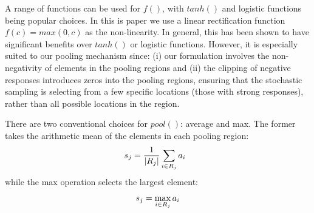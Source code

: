 \documentclass{article} %
\def\BE{\vspace{-0.0mm}\begin{equation}}
\def\EE{\vspace{-0.0mm}\end{equation}}
\begin{document}
A range of functions can be used for $f()$, with $tanh()$ and logistic
functions being popular choices. In this is paper we use a linear rectification
function $f(c) = max(0,c)$ as the non-linearity. In
general, this has been shown \cite{Nair10} to have significant
benefits over $tanh()$ or logistic functions. However, it is especially
suited to our pooling mechanism since: (i) our formulation involves the non-negativity
of elements in the pooling regions and (ii) the clipping of negative
responses introduces zeros into the pooling regions, ensuring that the
stochastic sampling is selecting from a few specific locations (those
with strong responses), rather than all possible locations in the
region.

There are two conventional choices for $pool()$: average and max. The
former takes the arithmetic mean of the elements in each pooling
region:
\BE s_j = \frac{1}{|R_j|} \sum_{i \in R_j} a_i \:\:\:  \EE
while the max operation selects the largest element:
\BE s_j = \max_{i \in R_j} a_i
\EE





%
\end{document}
